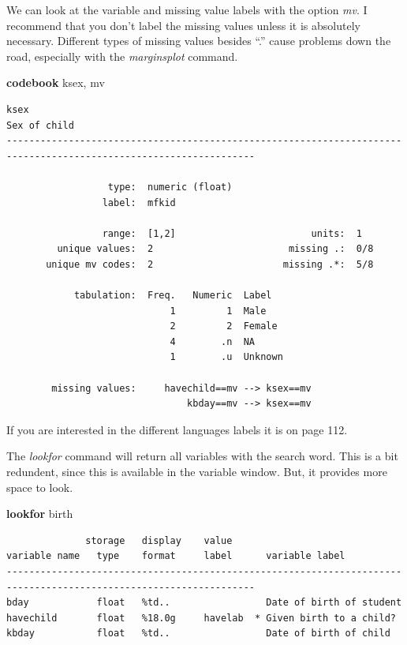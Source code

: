 \documentclass[
]{book}
\newenvironment{Shaded}{\begin{snugshade}}{\end{snugshade}}
\newcommand{\KeywordTok}[1]{\textcolor[rgb]{0.13,0.29,0.53}{\textbf{#1}}}
\newcommand{\NormalTok}[1]{#1}
\begin{document}
We can look at the variable and missing value labels with the option \emph{mv}. I recommend that you don't label the missing values unless it is absolutely necessary. Different types of missing values besides ``.'' cause problems down the road, especially with the \emph{marginsplot} command.

\begin{Shaded}
\begin{Highlighting}[]
\KeywordTok{codebook}\NormalTok{ ksex, mv}
\end{Highlighting}
\end{Shaded}

\begin{verbatim}
ksex                                                                                                  Sex of child
------------------------------------------------------------------------------------------------------------------

                  type:  numeric (float)
                 label:  mfkid

                 range:  [1,2]                        units:  1
         unique values:  2                        missing .:  0/8
       unique mv codes:  2                       missing .*:  5/8

            tabulation:  Freq.   Numeric  Label
                             1         1  Male
                             2         2  Female
                             4        .n  NA
                             1        .u  Unknown

        missing values:     havechild==mv --> ksex==mv
                                kbday==mv --> ksex==mv
\end{verbatim}

If you are interested in the different languages labels it is on page 112.

The \emph{lookfor} command will return all variables with the search word. This is a bit redundent, since this is available in the variable window. But, it provides more space to look.

\begin{Shaded}
\begin{Highlighting}[]
\KeywordTok{lookfor}\NormalTok{ birth}
\end{Highlighting}
\end{Shaded}

\begin{verbatim}
              storage   display    value
variable name   type    format     label      variable label
------------------------------------------------------------------------------------------------------------------
bday            float   %td..                 Date of birth of student
havechild       float   %18.0g     havelab  * Given birth to a child?
kbday           float   %td..                 Date of birth of child
\end{verbatim}
\end{document}
